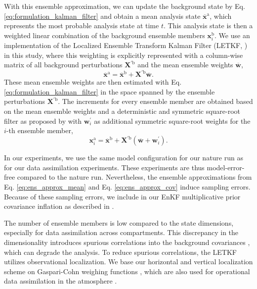 \documentclass[hess, manuscript]{copernicus}
\begin{document}
With this ensemble approximation, we can update the background state by Eq. \eqref{eq:formulation_kalman_filter} and obtain a mean analysis state $\overline{\mathbf{x}}^\text{a}$, which represents the most probable analysis state at time $t$.
This analysis state is then a weighted linear combination of the background ensemble members $\mathbf{x}^\text{b}_{i}$.
We use an implementation of the Localized Ensemble Transform Kalman Filter (LETKF, \citet{bishop_adaptive_2001,hunt_efficient_2007}) in this study, where this weighting is explicitly represented with a column-wise matrix of all background perturbations $\mathbf{X}^{\prime\text{b}}$ and the mean ensemble weights $\overline{\textbf{w}}$,
\begin{equation}
	\overline{\mathbf{x}}^\text{a} = \overline{\mathbf{x}}^\text{b} + \mathbf{X}^{\prime\text{b}} \overline{\mathbf{w}}.\label{eq:letkf_eq}
\end{equation}
These mean ensemble weights are then estimated with Eq. \eqref{eq:formulation_kalman_filter} in the space spanned by the ensemble perturbations $\mathbf{X}^{\prime\text{b}}$.
The increments for every ensemble member are obtained based on the mean ensemble weights and a deterministic and symmetric square-root filter as proposed by \citet{hunt_efficient_2007} with $\mathbf{w}^\prime_{i}$ as additional symmetric square-root weights for the $i$-th ensemble member,
\begin{equation*}
	\mathbf{x}^\text{a}_{i} = \overline{\mathbf{x}}^\text{b} + \mathbf{X}^{\prime\text{b}} (\overline{\mathbf{w}}+\mathbf{w}^\prime_{i}).
\end{equation*}

In our experiments, we use the same model configuration for our nature run as for our data assimilation experiments.
These experiments are thus model-error-free compared to the nature run.
Nevertheless, the ensemble approximations from Eq. \eqref{eq:ens_approx_mean} and Eq. \eqref{eq:ens_approx_cov} induce sampling errors.
Because of these sampling errors, we include in our EnKF multiplicative prior covariance inflation as described in \citet{hunt_efficient_2007}.

The number of ensemble members is low compared to the state dimensions, especially for data assimilation across compartments.
This discrepancy in the dimensionality introduces spurious correlations into the background covariances \citep{miyoshi_10240-member_2014}, which can degrade the analysis.
To reduce spurious correlations, the LETKF utilizes observational localization.
We base our horizontal and vertical localization scheme on Gaspari-Cohn weighing functions \citep{gaspari_construction_1999}, which are also used for operational data assimilation in the atmosphere \citep{schraff_kilometre-scale_2016}.
\end{document}
